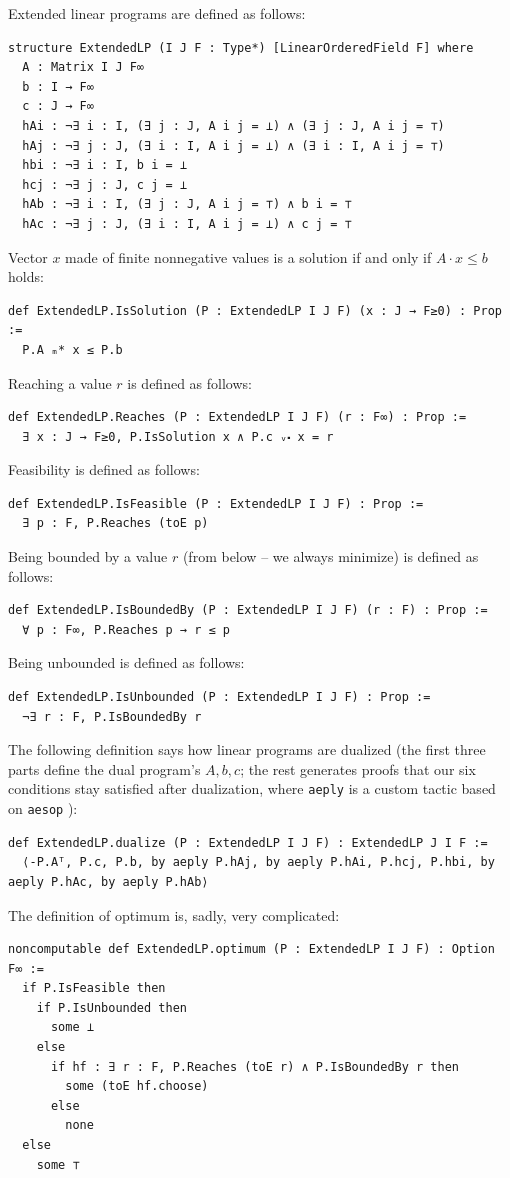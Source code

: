 \documentclass[]{article}
\renewcommand{\.}{\hskip .75pt}
\let\*=\cdot
\begin{document}
Extended linear programs are defined as follows:
\begin{lstlisting}
structure ExtendedLP (I J F : Type*) [LinearOrderedField F] where
  A : Matrix I J F∞
  b : I → F∞
  c : J → F∞
  hAi : ¬∃ i : I, (∃ j : J, A i j = ⊥) ∧ (∃ j : J, A i j = ⊤)
  hAj : ¬∃ j : J, (∃ i : I, A i j = ⊥) ∧ (∃ i : I, A i j = ⊤)
  hbi : ¬∃ i : I, b i = ⊥
  hcj : ¬∃ j : J, c j = ⊥
  hAb : ¬∃ i : I, (∃ j : J, A i j = ⊤) ∧ b i = ⊤
  hAc : ¬∃ j : J, (∃ i : I, A i j = ⊥) ∧ c j = ⊤
\end{lstlisting}
Vector $x$ made of finite nonnegative values is a solution if and only if $A \* x \le b$
holds:
\begin{lstlisting}
def ExtendedLP.IsSolution (P : ExtendedLP I J F) (x : J → F≥0) : Prop :=
  P.A ₘ* x ≤ P.b
\end{lstlisting}
Reaching a value $r$ is defined as follows:
\begin{lstlisting}
def ExtendedLP.Reaches (P : ExtendedLP I J F) (r : F∞) : Prop :=
  ∃ x : J → F≥0, P.IsSolution x ∧ P.c ᵥ⬝ x = r
\end{lstlisting}
Feasibility is defined as follows:
\begin{lstlisting}
def ExtendedLP.IsFeasible (P : ExtendedLP I J F) : Prop :=
  ∃ p : F, P.Reaches (toE p)
\end{lstlisting}
Being bounded by a value $r$ (from below -- we always minimize) is defined as follows:
\begin{lstlisting}
def ExtendedLP.IsBoundedBy (P : ExtendedLP I J F) (r : F) : Prop :=
  ∀ p : F∞, P.Reaches p → r ≤ p
\end{lstlisting}
Being unbounded is defined as follows:
\begin{lstlisting}
def ExtendedLP.IsUnbounded (P : ExtendedLP I J F) : Prop :=
  ¬∃ r : F, P.IsBoundedBy r
\end{lstlisting}
The following definition says how linear programs are dualized (the first three parts
define the dual program's $A, b, c$; the rest generates proofs that our six conditions stay satisfied
after dualization, where \texttt{aeply} is a custom tactic based on \texttt{aesop} \cite{Aesop}):
\begin{lstlisting}
def ExtendedLP.dualize (P : ExtendedLP I J F) : ExtendedLP J I F :=
  ⟨-P.Aᵀ, P.c, P.b, by aeply P.hAj, by aeply P.hAi, P.hcj, P.hbi, by aeply P.hAc, by aeply P.hAb⟩
\end{lstlisting}
The definition of optimum is, sadly, very complicated:
\begin{lstlisting}
noncomputable def ExtendedLP.optimum (P : ExtendedLP I J F) : Option F∞ :=
  if P.IsFeasible then
    if P.IsUnbounded then
      some ⊥ 
    else
      if hf : ∃ r : F, P.Reaches (toE r) ∧ P.IsBoundedBy r then
        some (toE hf.choose)
      else
        none
  else
    some ⊤
\end{lstlisting}
\end{document}
